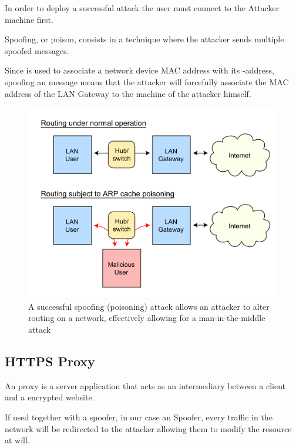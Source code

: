 In order to deploy a successful  attack the user must connect to the Attacker machine first.

 Spoofing, or  poison, consists in a technique where the attacker sends multiple spoofed  messages.

Since  is used to associate a network device MAC address with its -address, spoofing an  message means that the attacker will forcefully associate the MAC address of the LAN Gateway to the machine of the attacker himself.

\begin{figure}[h!]
 \centering
 \includegraphics[width=13cm]{img/ARP_Spoofing.png}
 \caption{A successful  spoofing (poisoning) attack allows an attacker to alter routing on a network, effectively allowing for a man-in-the-middle attack\cite{arp-spoofing}}
 \label{fig: ARP Spoofing}
\end{figure}

\newpage

\subsection{HTTPS Proxy}

An  proxy is a server application that acts as an intermediary between a client and a  encrypted website.

If used together with a spoofer, in our case an  Spoofer, every  traffic in the network will be redirected to the attacker allowing them to modify the resource at will.

